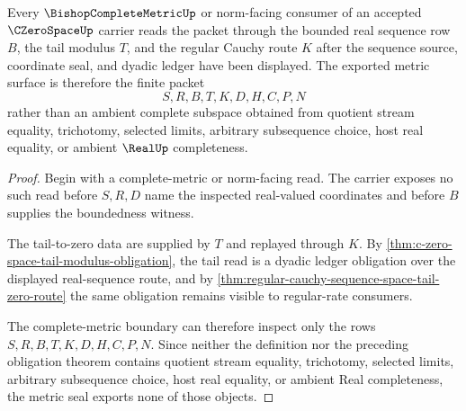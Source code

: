 \begin{theorem}
\label{thm:c-zero-space-metric-seal}
Every $\BishopCompleteMetricUp$ or norm-facing consumer of an accepted $\CZeroSpaceUp$ carrier reads the packet through the bounded real sequence row $B$, the tail modulus $T$, and the regular Cauchy route $K$ after the sequence source, coordinate seal, and dyadic ledger have been displayed. The exported metric surface is therefore the finite packet
$$
S,R,B,T,K,D,H,C,P,N
$$
rather than an ambient complete subspace obtained from quotient stream equality, trichotomy, selected limits, arbitrary subsequence choice, host real equality, or ambient $\RealUp$ completeness.
\end{theorem}
\begin{proof}
Begin with a complete-metric or norm-facing read. The carrier exposes no such read before $S,R,D$ name the inspected real-valued coordinates and before $B$ supplies the boundedness witness.

The tail-to-zero data are supplied by $T$ and replayed through $K$. By \autoref{thm:c-zero-space-tail-modulus-obligation}, the tail read is a dyadic ledger obligation over the displayed real-sequence route, and by \autoref{thm:regular-cauchy-sequence-space-tail-zero-route} the same obligation remains visible to regular-rate consumers.

The complete-metric boundary can therefore inspect only the rows $S,R,B,T,K,D,H,C,P,N$. Since neither the definition nor the preceding obligation theorem contains quotient stream equality, trichotomy, selected limits, arbitrary subsequence choice, host real equality, or ambient Real completeness, the metric seal exports none of those objects.
\end{proof}


\begin{closurestatus}{\CZeroSpaceUp}
  \theoryclosure{\seedClosure}
  \formalstatus{\unformalizedV}
\end{closurestatus}
